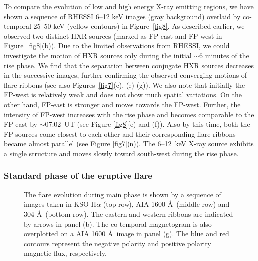 \documentclass[twocolumn]{aastex6}
\begin{document}
To compare the evolution of low and high energy X-ray emitting regions, we have shown a sequence of RHESSI 6--12 keV images (gray background) overlaid by co-temporal 25--50 keV (yellow contours) in Figure~\ref{fig8}. As described earlier, we observed two distinct HXR sources (marked as FP-east and FP-west in Figure~\ref{fig8}(b)). Due to the limited observations from RHESSI, we could investigate the motion of HXR sources only during the initial $\sim $6 minutes of the rise phase. We find that the separation between conjugate HXR sources decreases in the successive images, further confirming the observed converging motions of flare ribbons (see also Figures~\ref{fig7}(c), (e)-(g)). We also note that initially the FP-west is relatively weak and does not show much spatial variations. On the other hand, FP-east is stronger and moves towards the FP-west. Further, the intensity of FP-west increases with the rise phase and becomes comparable to the FP-east by $\sim$07:02~UT (see Figure \ref{fig8}(e) and (f)). Also by this time, both the FP sources come closest to each other and their corresponding flare ribbons became almost parallel (see Figure \ref{fig7}(n)). The 6--12~keV X-ray source exhibits a single structure and moves slowly toward south-west during the rise phase. 

\subsubsection {Standard phase of the eruptive flare}

\begin{figure*}
\caption{The flare evolution during main phase is shown by a sequence of images taken in KSO H$ \alpha $ (top row), AIA 1600 \AA~(middle row) and 304 \AA~(bottom row). The eastern and western ribbons are indicated by arrows in panel (b). The co-temporal magnetogram is also overplotted on a AIA 1600 \AA~image in panel (g). The blue and red contours represent the negative polarity and positive polarity magnetic flux, respectively.}
\label{fig9}
\end{figure*}
\end{document}
